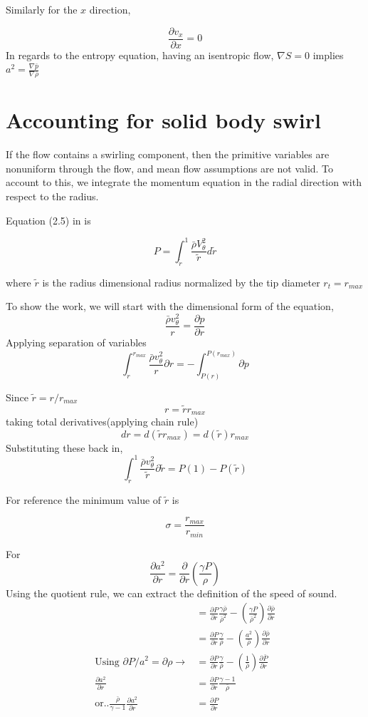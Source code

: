 \documentclass[12pt]{article}
\begin{document}
Similarly for the $x$ direction,

\[ \frac{\partial v_x}{\partial x} = 0 \]
In regards to the entropy equation, having an isentropic flow, $\nabla S = 0$ implies $a^2= \frac{\nabla \bar{p}}{ \nabla \bar{\rho}}$ 

\section{Accounting for solid body swirl}

If the flow contains a swirling component, then the primitive variables are nonuniform through the flow, and mean flow assumptions are not valid. To account to this, we integrate the momentum equation in the radial direction with respect to the radius. 

Equation (2.5) in \cite{Kousen1999} is 

\[P = \int_{\tilde{r}}^{1} \frac{\bar{\rho} V_{\theta}^2}{\tilde{r}} d\tilde{r}\] 

where $\tilde{r}$ is the radius dimensional radius normalized by the tip diameter $r_t = r_{max}$

To show the work, we will start with the dimensional form of the equation,
\[
\frac{\bar{\rho} v_{\theta}^2}{r} 
=\frac{\partial p}{\partial r}
\]
Applying separation of variables
\[
\int_{r}^{r_{max}} \frac{\bar{\rho} v_{\theta}^2}{r}\partial r 
=-\int_{P(r)}^{P(r_{max})}\partial p
\]

Since $\tilde{r} = r/r_{max}$
\[r = \tilde{r}r_{max}\]
taking total derivatives(applying chain rule)
\[dr = d(\tilde{r}r_{max}) = d(\tilde{r})r_{max}\]
Substituting these back in,
\[
\int_{\tilde{r}}^{1} \frac{\bar{\rho} v_{\theta}^2}{\tilde{r}}\partial \tilde{r} 
=P(1)-P(\tilde{r})
\]

For reference the minimum value of $\tilde{r}$ is

\[\sigma = \frac{r_{max}}{r_{min}}\]

For 
\[\frac{\partial a^2}{\partial r } = \frac{\partial}{\partial r} \left( \frac{\gamma P}{\rho} \right)\]
Using the quotient rule, we can extract the definition of the speed of sound.
\begin{align*}
&= \frac{\partial P}{\partial r} \frac{\gamma \bar{\rho}}{\bar{\rho}^2} - \left( \frac{\gamma P}{\bar{\rho}^2} \right) \frac{\partial \bar{\rho}}{\partial r}\\
&=  \frac{\partial P}{\partial r} \frac{\gamma }{\bar{\rho}} - \left( \frac{a^2}{\bar{\rho}} \right) \frac{\partial \bar{\rho} }{\partial r}\\ \text{Using } \partial P/a^2 = \partial \rho \rightarrow &= \frac{\partial P}{\partial r} \frac{\gamma }{\bar{\rho}} - \left( \frac{1}{\bar{\rho}} \right) \frac{\partial \bar{ P} }{\partial r}\\
\frac{\partial a^2}{\partial r} &= \frac{\partial P}{\partial r} \frac{\gamma - 1}{\bar{\rho}}  \\ \text{or..}
\frac{\bar{\rho}}{\gamma -1}\frac{\partial a^2}{\partial r} &= \frac{\partial P}{\partial r} 
\end{align*}
\end{document}
